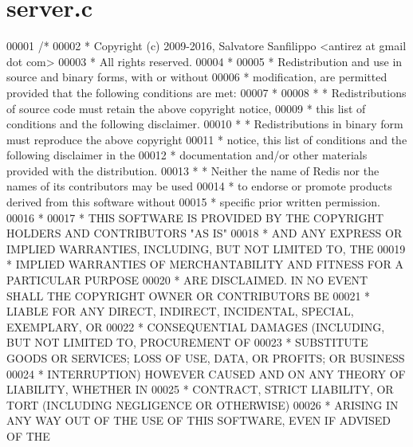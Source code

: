 \hypertarget{server_8c_source}{}\section{server.\+c}
\label{server_8c_source}

\begin{DoxyCode}
00001 \textcolor{comment}{/*}
00002 \textcolor{comment}{ * Copyright (c) 2009-2016, Salvatore Sanfilippo <antirez at gmail dot com>}
00003 \textcolor{comment}{ * All rights reserved.}
00004 \textcolor{comment}{ *}
00005 \textcolor{comment}{ * Redistribution and use in source and binary forms, with or without}
00006 \textcolor{comment}{ * modification, are permitted provided that the following conditions are met:}
00007 \textcolor{comment}{ *}
00008 \textcolor{comment}{ *   * Redistributions of source code must retain the above copyright notice,}
00009 \textcolor{comment}{ *     this list of conditions and the following disclaimer.}
00010 \textcolor{comment}{ *   * Redistributions in binary form must reproduce the above copyright}
00011 \textcolor{comment}{ *     notice, this list of conditions and the following disclaimer in the}
00012 \textcolor{comment}{ *     documentation and/or other materials provided with the distribution.}
00013 \textcolor{comment}{ *   * Neither the name of Redis nor the names of its contributors may be used}
00014 \textcolor{comment}{ *     to endorse or promote products derived from this software without}
00015 \textcolor{comment}{ *     specific prior written permission.}
00016 \textcolor{comment}{ *}
00017 \textcolor{comment}{ * THIS SOFTWARE IS PROVIDED BY THE COPYRIGHT HOLDERS AND CONTRIBUTORS "AS IS"}
00018 \textcolor{comment}{ * AND ANY EXPRESS OR IMPLIED WARRANTIES, INCLUDING, BUT NOT LIMITED TO, THE}
00019 \textcolor{comment}{ * IMPLIED WARRANTIES OF MERCHANTABILITY AND FITNESS FOR A PARTICULAR PURPOSE}
00020 \textcolor{comment}{ * ARE DISCLAIMED. IN NO EVENT SHALL THE COPYRIGHT OWNER OR CONTRIBUTORS BE}
00021 \textcolor{comment}{ * LIABLE FOR ANY DIRECT, INDIRECT, INCIDENTAL, SPECIAL, EXEMPLARY, OR}
00022 \textcolor{comment}{ * CONSEQUENTIAL DAMAGES (INCLUDING, BUT NOT LIMITED TO, PROCUREMENT OF}
00023 \textcolor{comment}{ * SUBSTITUTE GOODS OR SERVICES; LOSS OF USE, DATA, OR PROFITS; OR BUSINESS}
00024 \textcolor{comment}{ * INTERRUPTION) HOWEVER CAUSED AND ON ANY THEORY OF LIABILITY, WHETHER IN}
00025 \textcolor{comment}{ * CONTRACT, STRICT LIABILITY, OR TORT (INCLUDING NEGLIGENCE OR OTHERWISE)}
00026 \textcolor{comment}{ * ARISING IN ANY WAY OUT OF THE USE OF THIS SOFTWARE, EVEN IF ADVISED OF THE}

\end{DoxyCode}
